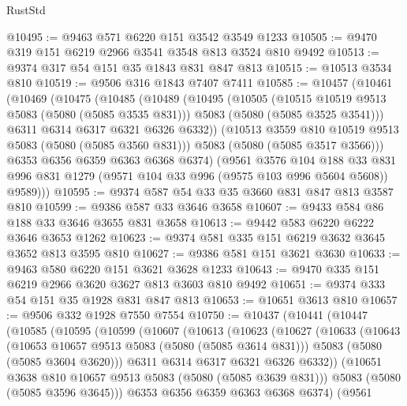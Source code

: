 \begin{lexlean}{RustStd}
\begin{coremodule}
@10495 := @9463 @571 @6220 @151 @3542 @3549 @1233
@10505 := @9470 @319 @151 @6219 @2966 @3541 @3548 @813 @3524 @810 @9492
@10513 := @9374 @317 @54 @151 @35 @1843 @831 @847 @813
@10515 := @10513 @3534 @810
@10519 := @9506 @316 @1843 @7407 @7411
@10585 := @10457
    (@10461
      (@10469
        (@10475
          (@10485
            (@10489
              (@10495
                (@10505
                  (@10515 @10519 @9513 @5083 (@5080 (@5085 @3535 @831)))
                  @5083
                  (@5080 (@5085 @3525 @3541)))
                @6311
                @6314
                @6317
                @6321
                @6326
                @6332))
            (@10513 @3559 @810 @10519 @9513 @5083 (@5080 (@5085 @3560 @831)))
            @5083
            (@5080 (@5085 @3517 @3566)))
          @6353
          @6356
          @6359
          @6363
          @6368
          @6374)
        (@9561
          @3576
          @104
          @188
          @33
          @831
          @996
          @831
          @1279
          (@9571 @104 @33 @996 (@9575 @103 @996 @5604 @5608))
          @9589)))
@10595 := @9374 @587 @54 @33 @35 @3660 @831 @847 @813 @3587 @810
@10599 := @9386 @587 @33 @3646 @3658
@10607 := @9433 @584 @86 @188 @33 @3646 @3655 @831 @3658
@10613 := @9442 @583 @6220 @6222 @3646 @3653 @1262
@10623 := @9374 @581 @335 @151 @6219 @3632 @3645 @3652 @813 @3595 @810
@10627 := @9386 @581 @151 @3621 @3630
@10633 := @9463 @580 @6220 @151 @3621 @3628 @1233
@10643 := @9470 @335 @151 @6219 @2966 @3620 @3627 @813 @3603 @810 @9492
@10651 := @9374 @333 @54 @151 @35 @1928 @831 @847 @813
@10653 := @10651 @3613 @810
@10657 := @9506 @332 @1928 @7550 @7554
@10750 := @10437
    (@10441
      (@10447
        (@10585
          (@10595
            (@10599
              (@10607
                (@10613
                  (@10623
                    (@10627
                      (@10633
                        (@10643
                          (@10653 @10657 @9513 @5083 (@5080 (@5085 @3614 @831)))
                          @5083
                          (@5080 (@5085 @3604 @3620)))
                        @6311
                        @6314
                        @6317
                        @6321
                        @6326
                        @6332))
                    (@10651 @3638 @810 @10657 @9513 @5083 (@5080 (@5085 @3639 @831)))
                    @5083
                    (@5080 (@5085 @3596 @3645)))
                  @6353
                  @6356
                  @6359
                  @6363
                  @6368
                  @6374)
                (@9561

\end{coremodule}
\end{lexlean}
